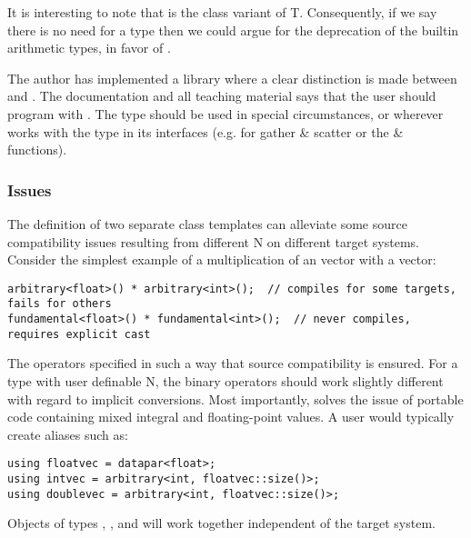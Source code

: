 It is interesting to note that  is the class variant of \type T.
Consequently, if we say there is no need for a  type then we could argue for the deprecation of the builtin arithmetic types, in favor of . 

The author has implemented a library where a clear distinction is made between  and .
The documentation and all teaching material says that the user should program with .
The  type should be used in special circumstances, or wherever  works with the  type in its interfaces (e.g. for gather \& scatter or the  \&  functions).

\subsubsection{Issues}
The definition of two separate class templates can alleviate some source compatibility issues resulting from different \code N on different target systems.
Consider the simplest example of a multiplication of an \intt vector with a \float vector:
\smallskip\begin{lstlisting}[style=Vc]
arbitrary<float>() * arbitrary<int>();  // compiles for some targets, fails for others
fundamental<float>() * fundamental<int>();  // never compiles, requires explicit cast
\end{lstlisting}
The \datapar[<T>] operators specified in such a way that source compatibility is ensured.
For a type with user definable \code N, the binary operators should work slightly different with regard to implicit conversions.
Most importantly,  solves the issue of portable code containing mixed integral and floating-point values.
A user would typically create aliases such as:
\smallskip\begin{lstlisting}[style=Vc]
using floatvec = datapar<float>;
using intvec = arbitrary<int, floatvec::size()>;
using doublevec = arbitrary<int, floatvec::size()>;
\end{lstlisting}
Objects of types , , and  will work together independent of the target system.

